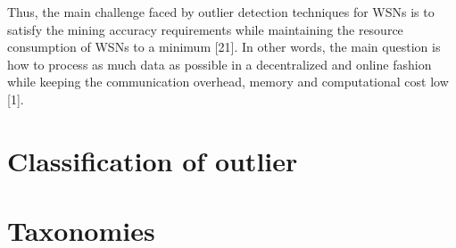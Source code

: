 \begin{framed}
	Thus, the main challenge faced by outlier detection techniques for WSNs is to satisfy the mining accuracy requirements while maintaining the resource consumption of WSNs
	to a minimum [21]. In other words, the main question is how to
	process as much data as possible in a decentralized and online
	fashion while keeping the communication overhead, memory
	and computational cost low [1].
\end{framed}


\section{Classification of outlier}

\section{Taxonomies}

